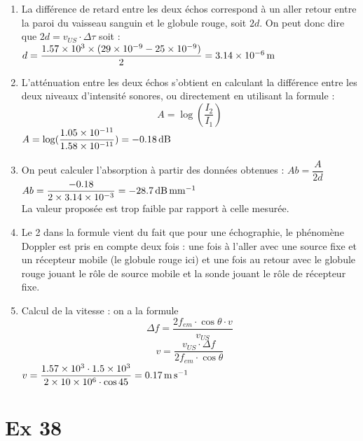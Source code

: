 \documentclass[a4paper,11pt,fleqn]{article}%
\begin{document}
\begin{enumerate}
	\item La différence de retard entre les deux échos correspond à un aller retour entre la paroi du vaisseau sanguin et le globule rouge, soit $2d$. On peut donc dire que $2d = v_{US} \cdot \Delta \tau$ soit : \\
 $d = \dfrac{\num{1,57E3} \times (\num{29E-9}-\num{25E-9})}{2} = \SI{3.14E-6}{m}$
	\item L'atténuation entre les deux échos s'obtient en calculant la différence entre les deux niveaux d'intensité sonores, ou directement en utilisant la formule : $$A = \log(\dfrac{I_2}{I_1})$$
 $A = \log(\dfrac{\num{1.05E-11}}{\num{1.58E-11}}) = \SI{-0.18}{dB}$
	\item On peut calculer l'absorption à partir des données obtenues : $Ab = \dfrac{A}{2d}$\\
 $Ab = \dfrac{\num{-0.18}}{2\times \num{3.14E-3}} = \SI{-28,7}{\deci\bel\per\milli\meter}$\\
La valeur proposée est trop faible par rapport à celle mesurée.
	\item Le 2 dans la formule vient du fait que pour une échographie, le phénomène Doppler est pris en compte deux fois : une fois à l'aller avec une source fixe et un récepteur mobile (le globule rouge ici) et une fois au retour avec le globule rouge jouant le rôle de source mobile et la sonde jouant le rôle de récepteur fixe.
	\item Calcul de la vitesse : on a la formule $$\Delta f = \dfrac{2 f_{em} \cdot \cos{\theta} \cdot v}{v_{US}}$$ $$v = \dfrac{v_{US} \cdot \Delta f}{2 f_{em} \cdot \cos{\theta}}$$
 $v = \dfrac{\num{1.57E3} \cdot \num{1.5E3}}{2 \times \num{10E6} \cdot \cos{45}} = \SI{0.17}{\meter\per\second}$
\end{enumerate}

\section*{Ex 38}
\end{document}
